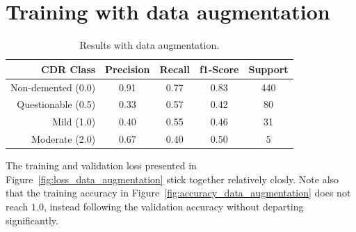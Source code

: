 \documentclass{kththesis}
\begin{document}
\section{Training with data augmentation}
\begin{table}[H]
  \begin{center}
    \caption{Results with data augmentation. \label{tab:results_data_augmentation}}
    \begin{tabular}{r|ccc|c}
      \textbf{CDR Class} & \textbf{Precision} & \textbf{Recall} & \textbf{f1-Score} & \textbf{Support} \\
      \toprule
           Non-demented (0.0) &  0.91   &  0.77  &   0.83   &   440 \\
           Questionable (0.5) &  0.33   &  0.57  &   0.42   &    80 \\
           Mild (1.0)         &  0.40   &  0.55  &   0.46   &    31 \\
           Moderate (2.0)     &  0.67   &  0.40  &   0.50   &     5 \\
    \end{tabular}
  \end{center}
\end{table}

The training and validation loss presented in Figure~\ref{fig:loss_data_augmentation} stick together relatively closly. Note also that the training accuracy in Figure~\ref{fig:accuracy_data_augmentation} does not reach $1.0$, instead following the validation accuracy without departing significantly.
\end{document}
